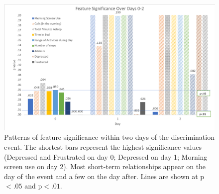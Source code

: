 \begin{figure}
     \centering

    \includegraphics[width=\textwidth]{img/feature-significance}
    \caption[Feature significance over time]{Patterns of feature significance within two days of the discrimination event. The shortest bars represent the highest significance values (\eg Depressed and Frustrated on day 0; Depressed on day 1; Morning screen use on day 2). Most short-term relationships appear on the day of the event and a few on the day after.  Lines are shown at p$<.05$ and p$<.01$.\\ }
    \label{fig:die-off}

\end{figure}


